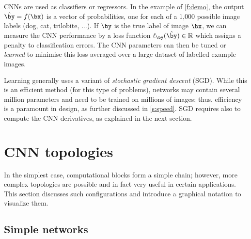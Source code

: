CNNs are used as classifiers or regressors. In the example of \autoref{f:demo}, the output $\hat \by = f(\bx)$ is a vector of probabilities, one for each of a 1,000 possible image labels (dog, cat, trilobite, ...).  If $\by$ is the true label of image $\bx$, we can measure the CNN performance by a loss function $\ell_\by(\hat \by)  \in \mathbb{R}$ which assigns a penalty to classification errors. The CNN parameters can then be tuned or \emph{learned} to minimise this loss averaged over a large dataset of labelled example images.

Learning generally uses a variant of \emph{stochastic gradient descent} (SGD). While this is an efficient method (for this type of problems), networks may contain several million parameters and need to be trained on millions of images; thus, efficiency is a paramount in \matlab design, as further discussed in \autoref{s:speed}. SGD requires also to compute the CNN derivatives, as explained in the next section.

\section{CNN topologies}\label{s:cnn-topology}

In the simplest case, computational blocks form a simple chain; however, more complex topologies are possible and in fact very useful in certain applications. This section discusses such configurations and introduce a graphical notation to visualize them.

\subsection{Simple networks}\label{s:cnn-simple}

